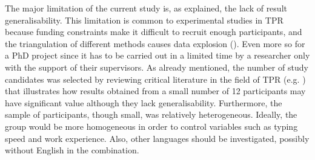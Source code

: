 The major limitation of the current study is, as explained, the lack of result generalisability. This limitation is common to experimental studies in TPR because funding constraints make it difficult to recruit enough participants, and the triangulation of different methods causes data explosion (\cite{o2009eye}). Even more so for a PhD project since it has to be carried out in a limited time by a researcher only with the support of their supervisors. As already mentioned, the number of study candidates was selected by reviewing critical literature in the field of TPR (e.g. \cite{o2009eye}) that illustrates how results obtained from a small number of 12 participants may have significant value although they lack generalisability. Furthermore, the sample of participants, though small, was relatively heterogeneous. Ideally, the group would be more homogeneous in order to control variables such as typing speed and work experience. Also, other languages should be investigated, possibly without English in the combination. 

